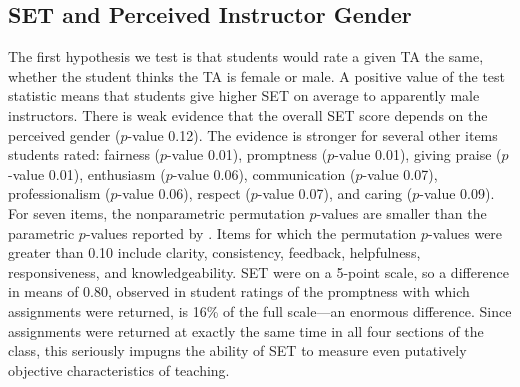 \documentclass[12pt]{article}
\begin{document}
\subsection{SET and Perceived Instructor Gender}
The first hypothesis we test is that students would rate a given TA the same,
whether the student thinks the TA is female or male. 
A positive value of the test statistic means that students give higher SET on average
to apparently male instructors.
There is weak evidence that the overall SET score depends on the perceived gender ($p$-value 0.12). 
The evidence is stronger for several other items students rated: 
fairness ($p$-value 0.01), 
promptness ($p$-value 0.01), 
giving praise ($p$-value 0.01), 
enthusiasm ($p$-value 0.06), 
communication ($p$-value 0.07), 
professionalism ($p$-value 0.06), 
respect ($p$-value 0.07), and 
caring ($p$-value 0.09). 
For seven items, the nonparametric permutation 
$p$-values are smaller than the parametric $p$-values reported by
\citet{MacNell2014}.
Items for which the permutation $p$-values were greater than 0.10 include clarity,
consistency, feedback, helpfulness, responsiveness, and knowledgeability.
SET were on a 5-point scale, so a difference in means of 0.80, observed
in student ratings of the promptness with which assignments were returned, 
is 16\% of the full scale---an enormous difference.
Since assignments were returned at exactly the same time in all
four sections of the class, this seriously impugns the ability of SET to measure
even putatively objective characteristics of teaching.
\end{document}
